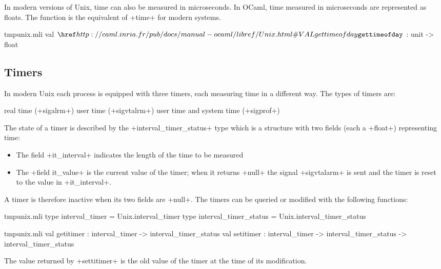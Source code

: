 In modern versions of Unix, time can also be measured in microseconds.
In OCaml, time measured in microseconds are represented as floats.  
The function  is the equivalent of \ml+time+ 
for modern systems.

%
\begin{listingcodefile}{tmpunix.mli}
val $\libvalue{Unix}{gettimeofday}$ : unit -> float
\end{listingcodefile}

\subsection*{Timers}
In modern Unix each process is equipped with three timers, each
measuring time in a different way.  The types of timers are:

%
\begin{mltypecases}
 real time (\ml+sigalrm+)
 user time (\ml+sigvtalrm+)
 user time and system time (\ml+sigprof+)
\end{mltypecases}
% 
The state of a timer is described by the \ml+interval_timer_status+
type which is a structure with two fields (each a \ml+float+)
representing time:


%
\begin{itemize}
\item The field \ml+it_interval+ indicates the length of the time 
to be measured
\item The \ml+field it_value+ is the current value of the timer; 
when it returns \ml+null+ the signal \ml+sigvtalarm+ is sent and 
the timer is reset to the value in \ml+it_interval+.
\end{itemize}
%

A timer is therefore inactive when its two fields are \ml+null+.  
The timers can be queried or modified with the following functions:

%
\begin{codefile}{tmpunix.mli}
type interval_timer = Unix.interval_timer
type interval_timer_status = Unix.interval_timer_status
\end{codefile}
%
\begin{listingcodefile}{tmpunix.mli}
val getitimer : interval_timer -> interval_timer_status
val setitimer : 
    interval_timer -> interval_timer_status -> interval_timer_status
\end{listingcodefile}
%

The value returned by \ml+settitimer+ is the old value of 
the timer at the time of its modification.

